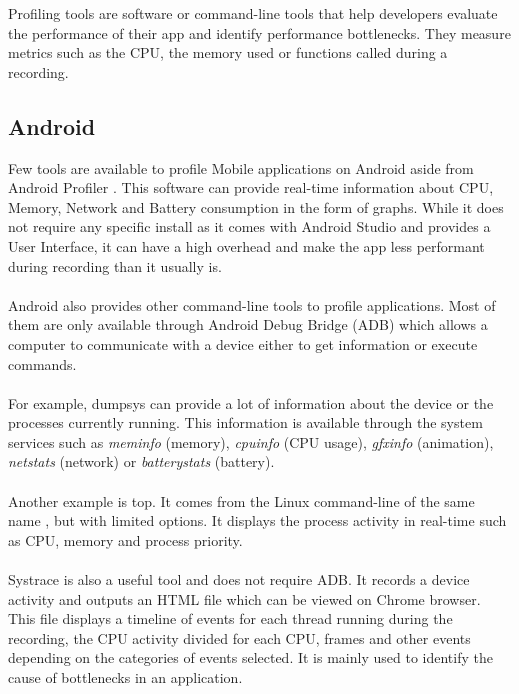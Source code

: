 \documentclass{kththesis}
\begin{document}
Profiling tools are software or command-line tools that help developers evaluate the performance of their app and identify performance bottlenecks. They measure metrics such as the CPU, the memory used or functions called during a recording.



\subsection{Android}

Few tools are available to profile Mobile applications on Android aside from Android Profiler \cite{nanoscope}. This software can provide real-time information about CPU, Memory, Network and Battery consumption in the form of graphs. While it does not require any specific install as it comes with Android Studio and provides a User Interface, it can have a high overhead \cite{nanoscope} and make the app less performant during recording than it usually is. 

\paragraph{}
Android also provides other command-line tools to profile applications. Most of them are only available through Android Debug Bridge (ADB) \cite{adb} which allows a computer to communicate with a device either to get information or execute commands. 

\paragraph{}
For example, dumpsys \cite{dumpsys} can provide a lot of information about the device or the processes currently running. This information is available through the system services such as \textit{meminfo} (memory), \textit{cpuinfo} (CPU usage), \textit{gfxinfo} (animation), \textit{netstats} (network) or \textit{batterystats} (battery).

\paragraph{}
Another example is top. It comes from the Linux command-line of the same name \cite{top}, but with limited options. It displays the process activity in real-time such as CPU, memory and process priority.

\paragraph{}
Systrace \cite{systrace} is also a useful tool and does not require ADB. It records a device activity and outputs an HTML file which can be viewed on Chrome browser. This file displays a timeline of events for each thread running during the recording, the CPU activity divided for each CPU, frames and other events depending on the categories of events selected. It is mainly used to identify the cause of bottlenecks in an application.
\end{document}
